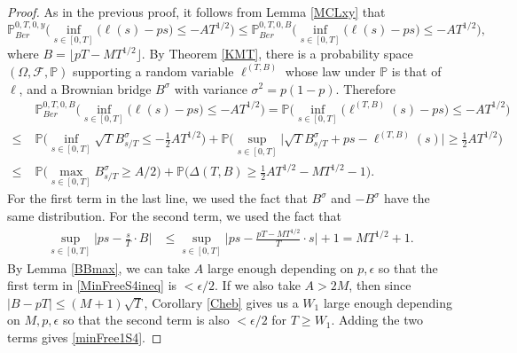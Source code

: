 \begin{proof}
	As in the previous proof, it follows from Lemma \ref{MCLxy} that
	\[
	\mathbb{P}^{0,T,0,y}_{Ber}\Big( \inf_{s \in [ 0, T]}\big( \ell(s) -  ps \big) \leq -AT^{1/2} \Big) \leq \mathbb{P}^{0,T,0,B}_{Ber}\Big( \inf_{s \in [ 0, T]}\big( \ell(s) -  ps \big) \leq -AT^{1/2} \Big),
	\]
	where $B=\lfloor pT - MT^{1/2}\rfloor$. By Theorem \ref{KMT}, there is a probability space $(\Omega,\mathcal{F},\mathbb{P})$ supporting a random variable $\ell^{(T,B)}$ whose law under $\mathbb{P}$ is that of $\ell$, and a Brownian bridge $B^\sigma$ with variance $\sigma^2 = p(1-p)$. Therefore
	\begin{align}
	&\mathbb{P}^{0,T,0,B}_{Ber}\Big( \inf_{s \in [ 0, T]}\big( \ell(s) -  ps \big) \leq -AT^{1/2} \Big) = \mathbb{P}\Big( \inf_{s \in [ 0, T]}\big( \ell^{(T,B)}(s) -  ps \big) \leq -AT^{1/2} \Big)\nonumber\\
	\leq \; & \mathbb{P}\Big( \inf_{s \in [ 0, T]}  \sqrt{T}B^\sigma_{s/T} \leq -\frac{1}{2}AT^{1/2} \Big) + \mathbb{P}\Big( \sup_{s\in [0,T]} \Big|\sqrt{T} B^\sigma_{s/T} + ps - \ell^{(T,B)}(s) \Big| \geq \frac{1}{2}AT^{1/2} \Big)\nonumber\\
	\leq \; & \mathbb{P}\Big( \max_{s\in[0,T]} B^\sigma_{s/T} \geq A/2 \Big) + \mathbb{P}\Big(\Delta(T,B) \geq \frac{1}{2}AT^{1/2} - MT^{1/2} - 1\Big). \label{MinFreeS4ineq}
	\end{align}
	For the first term in the last line, we used the fact that $B^\sigma$ and $-B^\sigma$ have the same distribution. For the second term, we used the fact that
	\begin{align*}
	\sup_{s\in[0,T]}\Big| ps - \frac{s}{T}\cdot B \Big| &\leq \sup_{s\in[0,T]}\Big| ps - \frac{pT-MT^{1/2}}{T}\cdot s \Big| + 1 = MT^{1/2} + 1.
	\end{align*}
	By Lemma \ref{BBmax}, we can take $A$ large enough depending on $p,\epsilon$ so that the first term in \eqref{MinFreeS4ineq} is $<\epsilon/2$. If we also take $A > 2M$, then since $|B-pT| \leq (M+1)\sqrt{T}$, Corollary \ref{Cheb} gives us a $W_1$ large enough depending on $M,p,\epsilon$ so that the second term is also $<\epsilon/2$ for $T\geq W_1$. Adding the two terms gives \eqref{minFree1S4}.
\end{proof}

